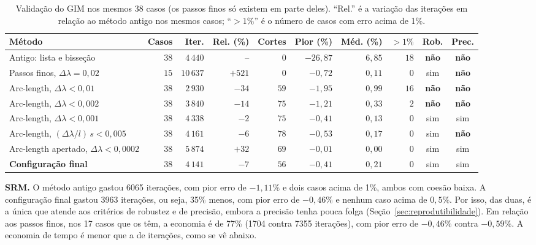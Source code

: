 \documentclass[11pt,a4paper]{article}
\numberwithin{equation}{section}
\begin{document}
\begin{table}[htbp]
\centering\footnotesize\setlength{\tabcolsep}{3.5pt}
\caption{Validação do GIM nos mesmos 38 casos (os passos finos só existem em parte deles). ``Rel.'' é a variação das iterações em relação ao método antigo nos mesmos casos; ``$>1\%$'' é o número de casos com erro acima de 1\%.}\label{tab:validacao_gim}
\begin{tabular}{p{4.3cm}rrrrrrrcc}
\toprule
Método & Casos & Iter. & Rel. (\%) & Cortes & Pior (\%) & Méd. (\%) & $>1\%$ & Rob. & Prec. \\
\midrule
Antigo: lista e bisseção & $38$ & $4\,440$ & -- & $0$ & $-26{,}87$ & $6{,}85$ & $18$ & \textbf{não} & \textbf{não} \\
Passos finos, $\Delta\lambda = 0{,}02$ & $15$ & $10\,637$ & $+$$521$ & $0$ & $-0{,}72$ & $0{,}11$ & $0$ & sim & \textbf{não} \\
Arc-length, $\Delta\lambda < 0{,}01$ & $38$ & $2\,930$ & $-34$ & $59$ & $-1{,}95$ & $0{,}99$ & $16$ & \textbf{não} & \textbf{não} \\
Arc-length, $\Delta\lambda < 0{,}002$ & $38$ & $3\,840$ & $-14$ & $75$ & $-1{,}21$ & $0{,}33$ & $2$ & \textbf{não} & \textbf{não} \\
Arc-length, $\Delta\lambda < 0{,}001$ & $38$ & $4\,338$ & $-2$ & $75$ & $-0{,}41$ & $0{,}13$ & $0$ & sim & sim \\
Arc-length, $(\Delta\lambda/l)\,s < 0{,}005$ & $38$ & $4\,161$ & $-6$ & $78$ & $-0{,}53$ & $0{,}17$ & $0$ & sim & \textbf{não} \\
Arc-length apertado, $\Delta\lambda < 0{,}0002$ & $38$ & $5\,874$ & $+$$32$ & $69$ & $-0{,}01$ & $0{,}00$ & $0$ & sim & sim \\
\textbf{Configuração final} & $38$ & $4\,141$ & $-7$ & $56$ & $-0{,}41$ & $0{,}21$ & $0$ & sim & sim \\
\bottomrule
\end{tabular}
\end{table}


\textbf{SRM.} O método antigo gastou 6065 iterações, com pior erro de $-1{,}11\%$ e dois casos acima de 1\%, ambos com coesão baixa. A configuração final gastou 3963 iterações, ou seja, 35\% menos, com pior erro de $-0{,}46\%$ e nenhum caso acima de $0{,}5\%$. Por isso, das duas, é a única que atende aos critérios de robustez e de precisão, embora a precisão tenha pouca folga (Seção~\ref{sec:reprodutibilidade}). Em relação aos passos finos, nos 17 casos que os têm, a economia é de 77\% (1704 contra 7355 iterações), com pior erro de $-0{,}46\%$ contra $-0{,}59\%$. A economia de tempo é menor que a de iterações, como se vê abaixo.
\end{document}
